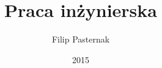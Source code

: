 \documentclass[11pt]{aghdpl}
\author{Filip Pasternak}
\title{Praca inżynierska}
\date{2015}
\begin{document}
\titlepages

{
	\fancyhf{}
	\renewcommand{\headrulewidth}{0pt}
	\renewcommand{\footrulewidth}{0pt}
}

\tableofcontents
\clearpage

\newpage










% 


\end{document}
